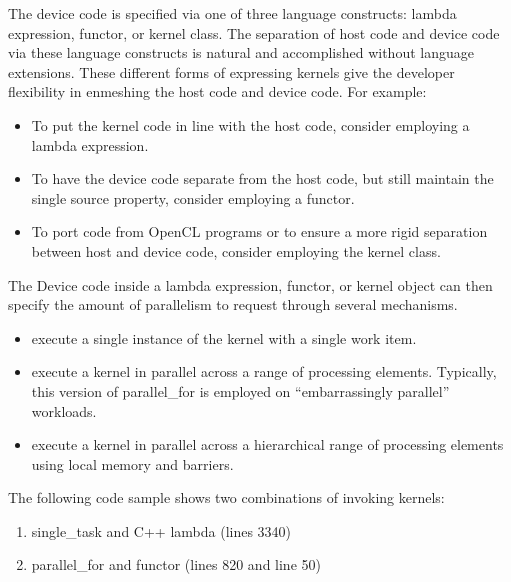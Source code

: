 \documentclass[letterpaper,10pt,english]{sphinxmanual}
\begin{document}
The device code is specified via one of three language constructs:
lambda expression, functor, or kernel class. The separation of host code
and device code via these language constructs is natural and
accomplished without language extensions. These different forms of
expressing kernels give the developer flexibility in enmeshing the host
code and device code. For example:
\begin{itemize}
\item {} 
To put the kernel code in line with the host code, consider employing
a lambda expression.

\item {} 
To have the device code separate from the host code, but still
maintain the single source property, consider employing a functor.

\item {} 
To port code from OpenCL programs or to ensure a more rigid
separation between host and device code, consider employing the
kernel class.

\end{itemize}

The Device code inside a lambda expression, functor, or kernel object
can then specify the amount of parallelism to request through several
mechanisms.
\begin{itemize}
\item {} 
 \textendash{} execute a single instance of the kernel with a
single work item.

\item {} 
 \textendash{} execute a kernel in parallel across a range of
processing elements. Typically, this version of parallel\_for is
employed on “embarrassingly parallel” workloads.

\item {} 
 \textendash{} execute a kernel in parallel across a
hierarchical range of processing elements using local memory and
barriers.

\end{itemize}

The following code sample shows two combinations of invoking kernels:
\begin{enumerate}
%
\item {} 
single\_task and C++ lambda (lines 33\sphinxhyphen{}40)

\item {} 
parallel\_for and functor (lines 8\sphinxhyphen{}20 and line 50)

\end{enumerate}
\end{document}
